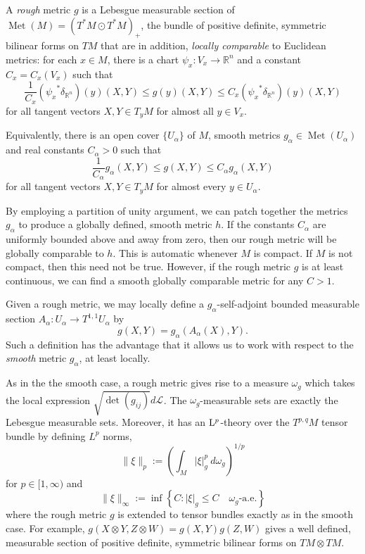 \documentclass[AMS,STIX1COL]{WileyNJD-v2}
\numberwithin{equation}{section}
\renewcommand{\~}{\tilde}
\renewcommand{\-}{\bar}
\newcommand{\R}{\mathbb{R}}
\newcommand{\8}{\infty}
\DeclareMathOperator{\met}{Met}
\newcommand{\dbrac}[1]{\left\{#1\right\}}
\newcommand{\set}[1]{\dbrac{#1}}
\newcommand{\script}[1]{\mathscr{#1}}
\newcommand{\pullb}[1]{{#1}^\ast}			%
\newcommand{\Leb}[1][{}]{\script{L}^{#1}}			%
\newcommand{\Lp}[2][{}]{{\rm L}^{#2}_{\rm #1}}		%
\begin{document}
\begin{defn}
\label{defn:rough_metric}
A \emph{rough} metric \(g\) is a Lebesgue measurable section of \(\met(M) = (T^{\ast} M \odot T^{\ast} M)_+\), the bundle of positive definite, symmetric bilinear forms on \(TM\) that are in addition, \emph{locally comparable} to Euclidean metrics:
for each $x \in M$, there is a chart $\psi_x:V_x \to \R^n$ and a constant $C_x = C_x(V_x)$ such that
\[
\frac{1}{C_{x}} (\pullb{\psi_x}\delta_{\R^n})(y) (X, Y) \leq g(y)(X, Y) \leq C_{x} (\pullb{\psi_x}\delta_{\R^n})(y) (X, Y)
\]
for all tangent vectors \(X, Y \in T_yM\) for almost all $y \in V_x$. 
\end{defn}

\begin{rem}
Equivalently, there is an open cover \(\lbrace U_{\alpha} \rbrace\) of \(M\), smooth metrics \(g_{\alpha} \in \met(U_{\alpha})\) and real constants \(C_{\alpha} > 0\) such that
\[
\frac{1}{C_{\alpha}} g_{\alpha} (X, Y) \leq g(X, Y) \leq C_{\alpha} g_{\alpha} (X, Y)
\]
for all tangent vectors \(X, Y \in T_yM\) for almost every $y \in U_\alpha$.
\end{rem}

\begin{rem}
By employing a partition of unity argument, we can patch together the metrics \(g_{\alpha}\) to produce a globally defined, smooth metric \(h\). If the constants \(C_{\alpha}\) are uniformly bounded above and away from zero, then our rough metric will be globally comparable to \(h\). This is automatic whenever \(M\) is compact. If \(M\) is not compact, then this need not be true.
However, if the rough metric $g$ is at least continuous, we can find a smooth globally comparable metric for any $C > 1$. 
\end{rem}

Given a rough metric, we may locally define a \(g_{\alpha}\)-self-adjoint bounded measurable section \(A_{\alpha} : U_{\alpha} \to T^{1,1}U_{\alpha}\) by
\[
g(X, Y) = g_{\alpha} (A_{\alpha} (X), Y).
\]
Such a definition has the advantage that it allows us to work with respect to the \emph{smooth} metric \(g_{\alpha}\), 
at least locally.

As in the the smooth case, a rough metric gives rise to a measure $\omega_g$ which takes the local expression $\sqrt{\det (g_{ij})} d\Leb$. 
The $\omega_g$-measurable sets are exactly the Lebesgue measurable sets. 
Moreover, it has an $\Lp{p}$-theory over the $T^{p,q}M$ tensor bundle by defining \(L^p\) norms,
\[
\|\xi\|_p := \left(\int_{M} |\xi|_{g}^p\ d\omega_g\right)^{1/p}
\]
for $p \in [1, \infty)$ and
\[
\|\xi\|_{\infty} := \inf\set{C: |\xi|_g \leq C\quad \omega_g\text{-a.e.}}
\]
where the rough metric \(g\) is extended to tensor bundles exactly as in the smooth case. For example, \(g(X \otimes Y, Z \otimes W) = g(X, Y) g(Z, W)\) gives a well defined, measurable section of positive definite, symmetric bilinear forms on \(TM \otimes TM\).
\end{document}
